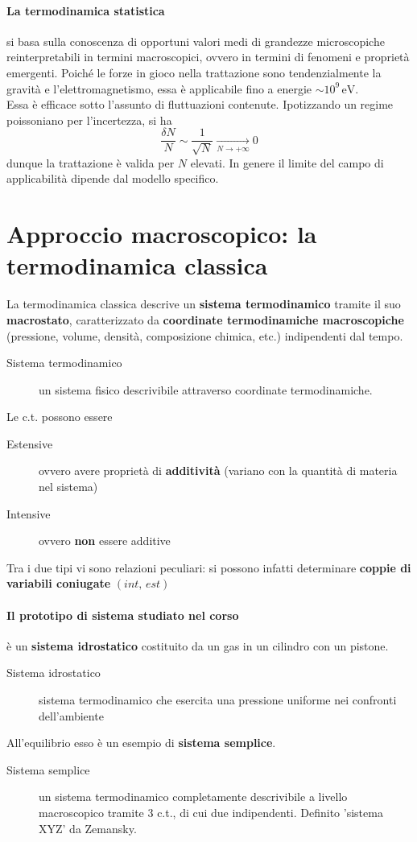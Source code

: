 \documentclass[10pt, oneside]{book}
\begin{document}
\paragraph{La termodinamica statistica} si basa sulla conoscenza di opportuni valori medi di grandezze microscopiche reinterpretabili in termini macroscopici, ovvero in termini di fenomeni e proprietà emergenti. Poiché le forze in gioco nella trattazione sono tendenzialmente la gravità e l'elettromagnetismo, essa è applicabile fino a energie $\sim 10^{9} \, \mathrm{eV}$. 
\\Essa è efficace sotto l'assunto di fluttuazioni contenute. Ipotizzando un regime poissoniano per l'incertezza, si ha
\[\frac{\delta N}{N} \sim \frac{1}{\sqrt{N}} \xrightarrow[N \rightarrow +\infty]{} 0\]
dunque la trattazione è valida per $N$ elevati. In genere il limite del campo di applicabilità dipende dal modello specifico.

\section{Approccio macroscopico: la termodinamica classica}
La termodinamica classica descrive un \textbf{sistema termodinamico} tramite il suo \textbf{macrostato}, caratterizzato da \textbf{coordinate termodinamiche macroscopiche} (pressione, volume, densità, composizione chimica, etc.) indipendenti dal tempo.
\begin{description}
\item[Sistema termodinamico] un sistema fisico descrivibile attraverso coordinate termodinamiche.
\end{description}
Le c.t. possono essere
\begin{description}
\item[Estensive] ovvero avere proprietà di \textbf{additività} (variano con la quantità di materia nel sistema)
\item[Intensive] ovvero \textbf{non} essere additive
\end{description}
Tra i due tipi vi sono relazioni peculiari: si possono infatti determinare \textbf{coppie di variabili coniugate} $(int, \, est)$
\paragraph{Il prototipo di sistema studiato nel corso} è un \textbf{sistema idrostatico} costituito da un gas in un cilindro con un pistone.
\begin{description}
\item[Sistema idrostatico] sistema termodinamico che esercita una pressione uniforme nei confronti dell'ambiente
\end{description}
All'equilibrio esso è un esempio di \textbf{sistema semplice}.
\begin{description}
\item[Sistema semplice] un sistema termodinamico completamente descrivibile a livello macroscopico tramite 3 c.t., di cui due indipendenti. Definito 'sistema XYZ' da Zemansky.
\end{description}
\end{document}

